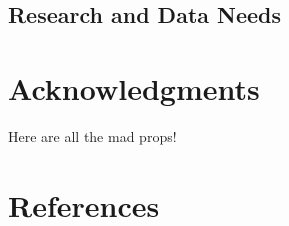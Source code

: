 \documentclass[11pt,
  english,
  letterpaper,
]{article}
\begin{document}
\hypertarget{research-and-data-needs-1}{%
\subsection{Research and Data Needs}\label{research-and-data-needs-1}}

\hypertarget{acknowledgments}{%
\section{Acknowledgments}\label{acknowledgments}}

Here are all the mad props!

\clearpage

\hypertarget{references}{%
\section{References}\label{references}}
\end{document}
